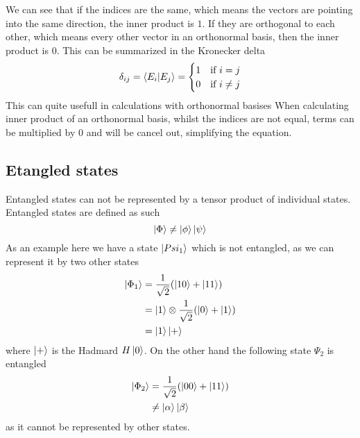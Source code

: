 We can see that if the indices are the same, which means the vectors are pointing into the same direction, the inner product is $1$.
If they are orthogonal to each other, which means every other vector in an orthonormal basis, then the inner product is $0$.
This can be summarized in the Kronecker delta
\begin{equation}
    \delta_{ij} = \braket{E_i|E_j} = \begin{cases} 1 & \text{if } i=j\\ 0 & \text{if } i \neq j
\end{cases}
\end{equation}
This can quite usefull in calculations with orthonormal basises
When calculating inner product of an orthonormal basis, whilst the indices are not equal, terms can be multiplied by $0$ and will be cancel out, simplifying the equation.

\subsection{Etangled states}
Entangled states can not be represented by a tensor product of individual states. 
Entangled states are defined as such
\begin{equation}
    \ket{\Phi} \neq \ket{\phi} \ket{\psi}
\end{equation}
As an example here we have a state $\ket{Psi_1}$ which is not entangled, as we can represent it by two other states
\begin{equation}
\begin{split}
\ket{\Phi_1} &= \frac{1}{\sqrt{2}} ( \ket{10} + \ket{11}) \\ 
&= \ket{1}\otimes \frac{1}{\sqrt{2}} ( \ket{0} + \ket{1})\\ 
&= \ket{1} \ket{+}
\end{split}
\end{equation}
where $\ket +$ is the Hadmard  $H \ket{0}$.
On the other hand the following state $\Psi_2$ is entangled 
\begin{equation}
\begin{split}
\ket{\Phi_2} &= \frac{1}{\sqrt{2}} ( \ket{00} + \ket{11}) \\
&\neq \ket{\alpha}\ket{\beta}
\end{split}
\end{equation}
as it cannot be represented by other states.
